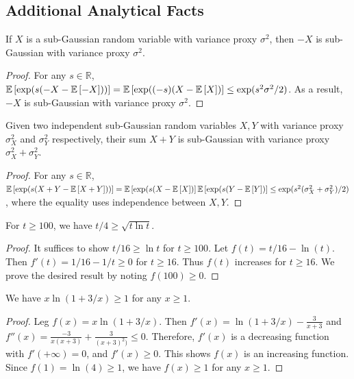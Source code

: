 \subsection{Additional Analytical Facts}
\begin{fact}\label{fact:negative-subgaussian}
If $X$ is a sub-Gaussian random variable with variance proxy $\sigma^2$, then $-X$ is sub-Gaussian with variance proxy $\sigma^2$. 
\end{fact}
\begin{proof}
For any $s \in \mathbb{R}$, $\mathbb E\left[\exp(s(-X - \mathbb E\left[-X\right]))\right] = \mathbb E\left[\exp((-s)(X-\mathbb E\left[X\right])\right] \leq \exp(s^2 \sigma^2 / 2)$. As a result, $-X$ is sub-Gaussian with variance proxy $\sigma^2$. 
\end{proof}
\begin{fact}\label{fact:addition-subGaussian}
Given two independent sub-Gaussian random variables $X,Y$ with variance proxy $\sigma_X^2$ and $\sigma_Y^2$ respectively, their sum $X+Y$ is sub-Gaussian with variance proxy $\sigma_X^2 + \sigma_Y^2.$
\end{fact}
\begin{proof}
For any $s \in \mathbb{R}$, $\mathbb E\left[\exp(s(X+Y-\mathbb E\left[X+Y\right]))\right] = \mathbb E\left[\exp(s(X-\mathbb E\left[X\right])\right]\mathbb E\left[\exp(s(Y-\mathbb E\left[Y\right])\right] \leq \exp(s^2 (\sigma_X^2+\sigma_Y^2) / 2)$, where the equality uses independence between $X,Y$.
\end{proof}

\begin{fact}\label{fact:lnt}
For $t \geq 100$, we have $t/4 \geq \sqrt{t\ln t}$.
\end{fact}
\begin{proof}
It suffices to show $t/16 \geq \ln t$ for $t \geq 100$. Let $f(t) = t/16 - \ln(t)$. Then $f'(t) = 1/16 - 1/t \geq 0$ for $t \geq 16$. Thus $f(t)$ increases for $t \geq 16$. We prove the desired result by noting $f(100) \geq 0$.
\end{proof}
\begin{fact}\label{fact:ln-property}
We have $x\ln(1+3/x) \geq 1$ for any $x \geq 1$.
\end{fact}
\begin{proof}
Leg $f(x) = x\ln(1+3/x)$. Then $f'(x) = \ln(1+3/x)-\frac{3}{x+3}$ and $f''(x) = \frac{-3}{x(x+3)} + \frac{3}{(x+3)^2)} \leq 0$. Therefore, $f'(x)$ is a decreasing function with $f'(+\infty) = 0$, and $f'(x) \geq 0$. This shows $f(x)$ is an increasing function. Since $f(1) = \ln(4) \geq 1$, we have $f(x) \geq 1$ for any $x \geq 1$.
\end{proof}